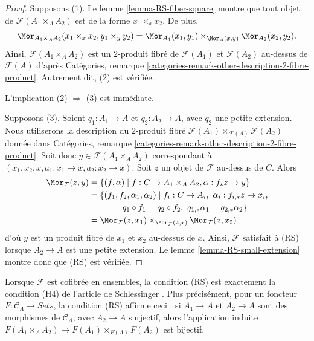 \begin{proof}
Supposons (1). Le lemme \ref{lemma-RS-fiber-square} montre que tout objet de
$\mathcal{F}(A_1 \times_A A_2)$ est de la forme $x_1 \times_x x_2$. De plus,
$$
\Mor_{A_1 \times_A A_2}(x_1 \times_x x_2, y_1 \times_y y_2) =
\Mor_{A_1}(x_1, y_1) \times_{\Mor_A(x, y)}
\Mor_{A_2}(x_2, y_2).
$$
Ainsi, $\mathcal{F}(A_1 \times_A A_2)$ est un $2$-produit fibré de
$\mathcal{F}(A_1)$ et $\mathcal{F}(A_2)$ au-dessus de $\mathcal{F}(A)$ d'après
Catégories, remarque \ref{categories-remark-other-description-2-fibre-product}.
Autrement dit, (2) est vérifiée.

\medskip\noindent
L'implication (2) $\Rightarrow$ (3) est immédiate.

\medskip\noindent
Supposons (3). Soient $q_1 : A_1 \to A$ et $q_2 : A_2 \to A$, avec $q_2$
une petite extension. Nous utiliserons la description du $2$-produit fibré
$\mathcal{F}(A_1) \times_{\mathcal{F}(A)} \mathcal{F}(A_2)$ donnée dans
Catégories, remarque \ref{categories-remark-other-description-2-fibre-product}.
Soit donc $y \in \mathcal{F}(A_1 \times_A A_2)$ correspondant à
$(x_1, x_2, x, a_1 : x_1 \to x, a_2 : x_2 \to x)$.
Soit $z$ un objet de $\mathcal{F}$ au-dessus de $C$. Alors
\begin{align*}
\Mor_\mathcal{F}(z, y) & =
\{(f, \alpha) \mid f : C \to A_1 \times_A A_2,
\alpha : f_*z \to y\} \\
& = \{(f_1, f_2, \alpha_1, \alpha_2) \mid
f_i : C \to A_i, \ \alpha_i : f_{i, *}z \to x_i, \\
& \quad\quad\quad\quad
q_1 \circ f_1 = q_2 \circ f_2, \ q_{1, *} \alpha_1 = q_{2, *}\alpha_2\} \\
& =
\Mor_\mathcal{F}(z, x_1) \times_{\Mor_\mathcal{F}(z, x)}
\Mor_\mathcal{F}(z, x_2)
\end{align*}
d'où $y$ est un produit fibré de $x_1$ et $x_2$ au-dessus de $x$. Ainsi,
$\mathcal{F}$ satisfait à (RS) lorsque $A_2 \to A$ est une petite extension.
Le lemme \ref{lemma-RS-small-extension} montre donc que (RS) est vérifiée.
\end{proof}

\begin{remark}
\label{remark-compare-schlessinger-H4}
Lorsque $\mathcal{F}$ est cofibrée en ensembles, la condition (RS) est
exactement la condition (H4) de l'article de Schlessinger
\cite[Theorem 2.11]{Sch}. Plus précisément, pour un foncteur
$F: \mathcal{C}_\Lambda \to \textit{Sets}$, la condition (RS) affirme ceci :
si $A_1 \to A$ et $A_2 \to A$ sont des morphismes de
$\mathcal{C}_\Lambda$, avec $A_2 \to A$ surjectif, alors l'application induite
$F(A_1 \times_A A_2) \to F(A_1) \times_{F(A)} F(A_2)$ est bijectif.
\end{remark}

